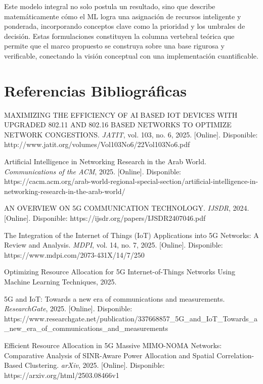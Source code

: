 \documentclass[12pt,a4paper]{article}
\begin{document}
Este modelo integral no solo postula un resultado, sino que describe matemáticamente cómo el ML logra una asignación de recursos inteligente y ponderada, incorporando conceptos clave como la prioridad y los umbrales de decisión. Estas formulaciones constituyen la columna vertebral teórica que permite que el marco propuesto se construya sobre una base rigurosa y verificable, conectando la visión conceptual con una implementación cuantificable.

\newpage

\section{Referencias Bibliográficas} \label{sec:referencias}
\begin{thebibliography}{99}

MAXIMIZING THE EFFICIENCY OF AI BASED IOT DEVICES WITH UPGRADED 802.11 AND 802.16 BASED NETWORKS TO OPTIMIZE NETWORK CONGESTIONS. \emph{JATIT}, vol. 103, no. 6, 2025. [Online]. Disponible: http://www.jatit.org/volumes/Vol103No6/22Vol103No6.pdf

Artificial Intelligence in Networking Research in the Arab World. \emph{Communications of the ACM}, 2025. [Online]. Disponible: https://cacm.acm.org/arab-world-regional-special-section/artificial-intelligence-in-networking-research-in-the-arab-world/

AN OVERVIEW ON 5G COMMUNICATION TECHNOLOGY. \emph{IJSDR}, 2024. [Online]. Disponible: https://ijsdr.org/papers/IJSDR2407046.pdf

The Integration of the Internet of Things (IoT) Applications into 5G Networks: A Review and Analysis. \emph{MDPI}, vol. 14, no. 7, 2025. [Online]. Disponible: https://www.mdpi.com/2073-431X/14/7/250

Optimizing Resource Allocation for 5G Internet-of-Things Networks Using Machine Learning Techniques, 2025.

5G and IoT: Towards a new era of communications and measurements. \emph{ResearchGate}, 2025. [Online]. Disponible: https://www.researchgate.net/publication/337668857\_5G\_and\_IoT\_Towards\_a\_new\_era\_of\_communications\_and\_measurements

Efficient Resource Allocation in 5G Massive MIMO-NOMA Networks: Comparative Analysis of SINR-Aware Power Allocation and Spatial Correlation-Based Clustering. \emph{arXiv}, 2025. [Online]. Disponible: https://arxiv.org/html/2503.08466v1


\end{thebibliography}
\end{document}
